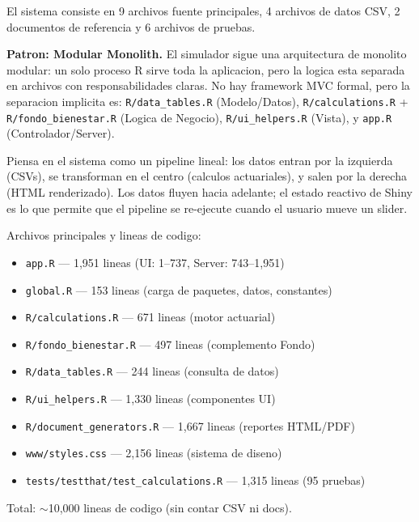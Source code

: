 \documentclass[11pt, letterpaper, twoside]{report}
\begin{document}
El sistema consiste en 9 archivos fuente principales, 4 archivos de datos CSV,
2 documentos de referencia y 6 archivos de pruebas.

\begin{patronbox}
\textbf{Patron: Modular Monolith.} El simulador sigue una arquitectura de monolito
modular: un solo proceso R sirve toda la aplicacion, pero la logica esta separada
en archivos con responsabilidades claras. No hay framework MVC formal, pero la
separacion implicita es: \texttt{R/data\_tables.R} (Modelo/Datos),
\texttt{R/calculations.R} + \texttt{R/fondo\_bienestar.R} (Logica de Negocio),
\texttt{R/ui\_helpers.R} (Vista), y \texttt{app.R} (Controlador/Server).
\end{patronbox}

\begin{intuicionbox}
Piensa en el sistema como un pipeline lineal: los datos entran por la izquierda
(CSVs), se transforman en el centro (calculos actuariales), y salen por la derecha
(HTML renderizado). Los datos fluyen hacia adelante; el estado reactivo de Shiny
es lo que permite que el pipeline se re-ejecute cuando el usuario mueve un slider.
\end{intuicionbox}

\begin{codigobox}
Archivos principales y lineas de codigo:
\begin{itemize}[nosep]
\item \texttt{app.R} --- 1,951 lineas (UI: 1--737, Server: 743--1,951)
\item \texttt{global.R} --- 153 lineas (carga de paquetes, datos, constantes)
\item \texttt{R/calculations.R} --- 671 lineas (motor actuarial)
\item \texttt{R/fondo\_bienestar.R} --- 497 lineas (complemento Fondo)
\item \texttt{R/data\_tables.R} --- 244 lineas (consulta de datos)
\item \texttt{R/ui\_helpers.R} --- 1,330 lineas (componentes UI)
\item \texttt{R/document\_generators.R} --- 1,667 lineas (reportes HTML/PDF)
\item \texttt{www/styles.css} --- 2,156 lineas (sistema de diseno)
\item \texttt{tests/testthat/test\_calculations.R} --- 1,315 lineas (95 pruebas)
\end{itemize}
Total: $\sim$10,000 lineas de codigo (sin contar CSV ni docs).
\end{codigobox}
\end{document}
